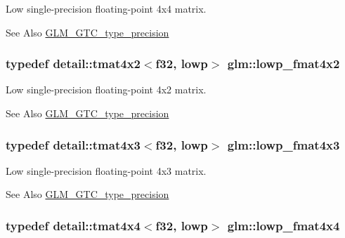 Low single-\/precision floating-\/point 4x4 matrix. \begin{DoxySeeAlso}{See Also}
\hyperlink{group__gtc__type__precision}{G\-L\-M\-\_\-\-G\-T\-C\-\_\-type\-\_\-precision} 
\end{DoxySeeAlso}
\hypertarget{group__gtc__type__precision_ga2433f92674e42eb6a75384fbab262306}{
\subsubsection[{lowp\-\_\-fmat4x2}]{\setlength{\rightskip}{0pt plus 5cm}typedef detail\-::tmat4x2$<$f32, lowp$>$ {\bf glm\-::lowp\-\_\-fmat4x2}}}\label{group__gtc__type__precision_ga2433f92674e42eb6a75384fbab262306}
Low single-\/precision floating-\/point 4x2 matrix. \begin{DoxySeeAlso}{See Also}
\hyperlink{group__gtc__type__precision}{G\-L\-M\-\_\-\-G\-T\-C\-\_\-type\-\_\-precision} 
\end{DoxySeeAlso}
\hypertarget{group__gtc__type__precision_gaa4df4f3adcc8eb3bed680b14a87fb2c4}{
\subsubsection[{lowp\-\_\-fmat4x3}]{\setlength{\rightskip}{0pt plus 5cm}typedef detail\-::tmat4x3$<$f32, lowp$>$ {\bf glm\-::lowp\-\_\-fmat4x3}}}\label{group__gtc__type__precision_gaa4df4f3adcc8eb3bed680b14a87fb2c4}
Low single-\/precision floating-\/point 4x3 matrix. \begin{DoxySeeAlso}{See Also}
\hyperlink{group__gtc__type__precision}{G\-L\-M\-\_\-\-G\-T\-C\-\_\-type\-\_\-precision} 
\end{DoxySeeAlso}
\hypertarget{group__gtc__type__precision_ga9ff955b170643f547661d2e7263ee426}{
\subsubsection[{lowp\-\_\-fmat4x4}]{\setlength{\rightskip}{0pt plus 5cm}typedef detail\-::tmat4x4$<$f32, lowp$>$ {\bf glm\-::lowp\-\_\-fmat4x4}}}\label{group__gtc__type__precision_ga9ff955b170643f547661d2e7263ee426}
